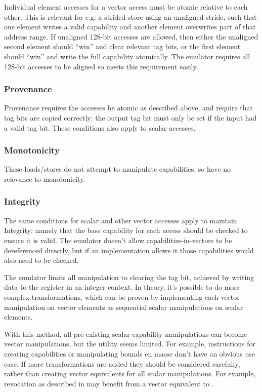 Individual element accesses for a vector access must be atomic relative to each other.
This is relevant for e.g. a strided store using an unaligned stride, such that one element writes a valid capability and another element overwrites part of that address range.
If unaligned 128-bit accesses are allowed, then either the unaligned second element should ``win'' and clear relevant tag bits, or the first element should ``win'' and write the full capability atomically.
The emulator requires all 128-bit accesses to be aligned so meets this requirement easily.

\subsubsection*{Provenance}
Provenance requires the accesses be atomic as described above, and require that tag bits are copied correctly: the output tag bit must only be set if the input had a valid tag bit.
These conditions also apply to scalar accesses.

\subsubsection*{Monotonicity}
These loads/stores do not attempt to manipulate capabilities, so have no relevance to monotonicity.

\subsubsection*{Integrity}
The same conditions for scalar and other vector accesses apply to maintain Integrity: namely that the base capability for each access should be checked to ensure it is valid.
The emulator doesn't allow capabilities-in-vectors to be dereferenced directly, but if an implementation allows it those capabilities would also need to be checked.

The emulator limits all manipulation to clearing the tag bit, achieved by writing data to the register in an integer context.
In theory, it's possible to do more complex transformations, which can be proven by implementing each vector manipulation on vector elements as sequential scalar manipulations on scalar elements.

With this method, all pre-existing scalar capability manipulations can become vector manipulations, but the utility seems limited.
For example, instructions for creating capabilities or manipulating bounds en masse don't have an obvious use case.
If more transformations are added they should be considered carefully, rather than creating vector equivalents for all scalar manipulations.
For example, revocation as described in \cite{xiaCHERIvokeCharacterisingPointer2019} may benefit from a vector equivalent to .

